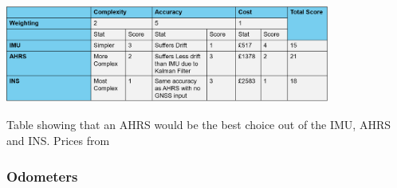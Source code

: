 \documentclass[11pt]{article}		%
\newcommand{\supercite}[1]{\textsuperscript{\cite{#1}}}		%
\begin{document}
            \begin{table}[h]
					\centering
					\includegraphics[width=0.8\textwidth]{ahrs comparison in pounds.png}
					\caption{Table showing that an AHRS would be the best choice out of the IMU, AHRS and INS. Prices from \cite{Ellipse_Ahrs}}
					\label{AHRS_comparison}
				\end{table}
				
        \subsubsection{Odometers}
        
\end{document}
